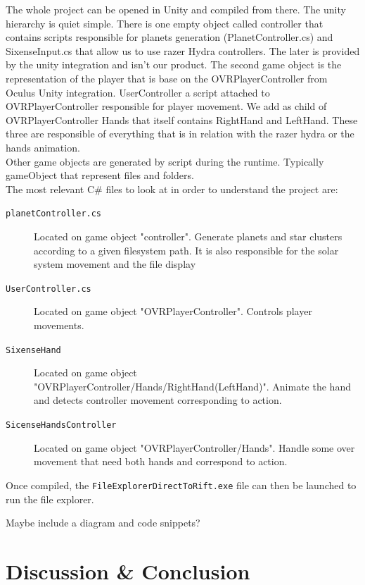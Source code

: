 \documentclass[paper=a4, fontsize=11pt]{scrartcl} %
\numberwithin{equation}{section} %
\numberwithin{figure}{section} %
\numberwithin{table}{section} %
\begin{document}
	
	The whole project can be opened in Unity and compiled from there.
	The unity hierarchy is quiet simple. There is one empty object called controller that contains scripts responsible for planets generation (PlanetController.cs) and SixenseInput.cs that allow us to use razer Hydra controllers. The later is provided by the unity integration and isn't our product. The second game object is the representation of the player that is base on the OVRPlayerController from Oculus Unity integration. UserController a script attached to OVRPlayerController responsible for player movement. We add as child of OVRPlayerController Hands that itself contains RightHand and LeftHand. These three are responsible of everything that is in relation with the razer hydra or the hands animation.\\
	Other game objects are generated by script during the runtime. Typically gameObject that represent files and folders.\\
	The most relevant C\# files to look at in order to understand the project are:
	\begin{description}
		\item[\texttt{planetController.cs}] Located on game object "controller". Generate planets and star clusters according to a given filesystem path. It is also responsible for the solar system movement and the file display 
		\item[\texttt{UserController.cs}] Located on game object "OVRPlayerController". Controls player movements.
		\item[\texttt{SixenseHand}] Located on game object "OVRPlayerController/Hands/RightHand(LeftHand)". Animate the hand and detects controller movement corresponding to action.
		\item[\texttt{SicenseHandsController}] Located on game object "OVRPlayerController/Hands". Handle some over movement that need both hands and correspond to action.
	\end{description}
	
	Once compiled, the \texttt{FileExplorerDirectToRift.exe} file can then be launched to run the file explorer.
	
	Maybe include a diagram and code snippets?
	

\section{Discussion \& Conclusion}
\end{document}
